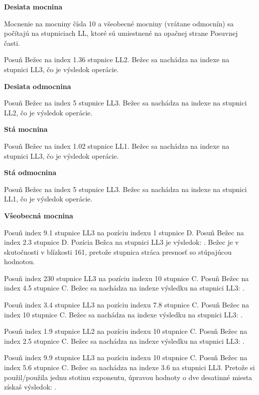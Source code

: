 \begin{multicols*}{3}
{  
  \textbf{Desiata mocnina}

\footnotesize Mocnenie na mocniny čísla 10 a všeobecné mocniny (vrátane odmocnín) sa počítajú na stupniciach LL, ktoré sú umiestnené na opačnej strane Posuvnej časti. \normalsize

Posuň Bežec na index 1.36 stupnice LL2.
Bežec sa nachádza na indexe  na stupnici LL3, čo je výsledok operácie.

  \textbf{Desiata odmocnina}

Posuň Bežec na index 5 stupnice LL3.
Bežec sa nachádza na indexe  na stupnici LL2, čo je výsledok operácie.

  \textbf{Stá mocnina}

Posuň Bežec na index 1.02 stupnice LL1.
Bežec sa nachádza na indexe  na stupnici LL3, čo je výsledok operácie.

  \textbf{Stá odmocnina}

Posuň Bežec na index 5 stupnice LL3.
Bežec sa nachádza na indexe  na stupnici LL1, čo je výsledok operácie.

  \textbf{Všeobecná mocnina}

Posuň index 9.1 stupnice LL3 na pozíciu indexu 1 stupnice D.
Posuň Bežec na index 2.3 stupnice D.
Pozícia Bežca na stupnici LL3 je výsledok: . Bežec je v skutočnosti v blízkosti 161, pretože stupnica stráca presnosť so stúpajúcou hodnotou. 

Posuň index 230 stupnice LL3 na pozíciu indexu 10 stupnice C.
Posuň Bežec na index 4.5 stupnice C.
Bežec sa nachádza na indexe výsledku na stupnici LL3: .

Posuň index 3.4 stupnice LL3 na pozíciu indexu 7.8 stupnice C.
Posuň Bežec na index 10 stupnice C.
Bežec sa nachádza na indexe výsledku na stupnici LL3: .

Posuň index 1.9 stupnice LL2 na pozíciu indexu 10 stupnice C.
Posuň Bežec na index 2.5 stupnice C.
Bežec sa nachádza na indexe výsledku na stupnici LL3: .

Posuň index 9.9 stupnice LL3 na pozíciu indexu 10 stupnice C.
Posuň Bežec na index 5.6 stupnice C.
Bežec sa nachádza na indexe 3.6 na stupnici LL3.
Pretože si použil/použila jednu stotinu exponentu, úpravou hodnoty o dve desatinné miesta získaš výsledok: .

}
\end{multicols*}
